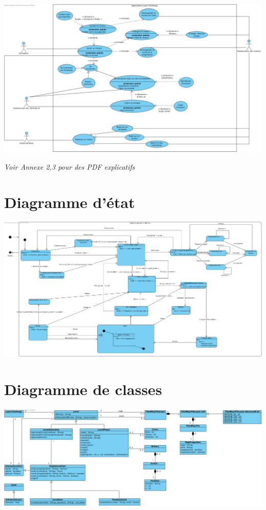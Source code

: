 \documentclass[a4paper,10pt]{article}
\begin{document}
\centerline{\includegraphics[scale=0.3]{../UseCase/UseCaseDiagram1.png}}

\textit{Voir Annexe 2,3 pour des PDF explicatifs }

\section{Diagramme d'état}

\centerline{\includegraphics[scale=0.3]{../StateMachineDiagram/StateMachineDiagram1.png}}

\newpage

\section{Diagramme de classes}
\centerline{\includegraphics[scale=0.5]{../ClassDiagram/ClassDiagram.png}}
\end{document}
